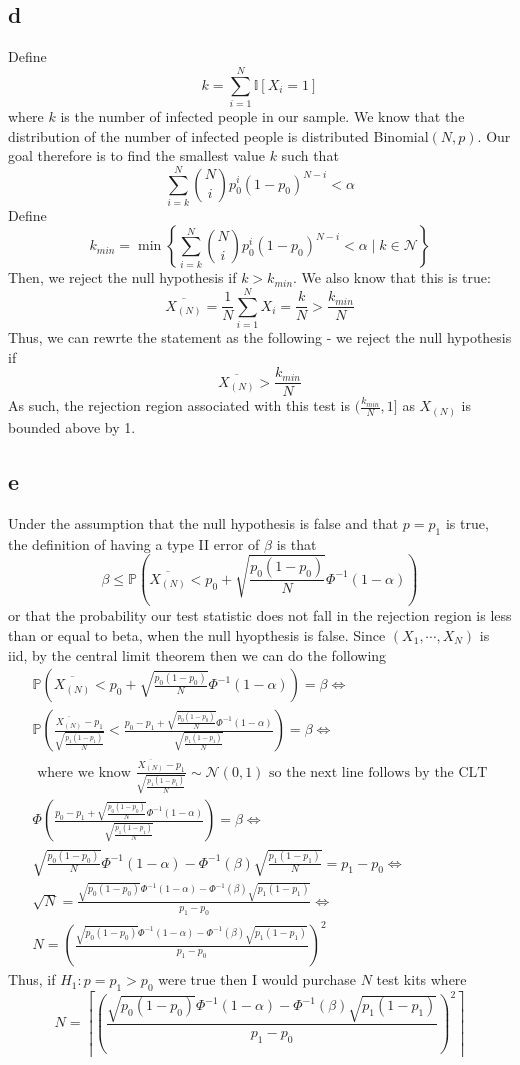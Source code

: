\documentclass[12pt,notitlepage]{article}
\newcommand{\N}{\mathcal{N}}
\begin{document}
\subsection*{d}
Define $$k  = \sum_{i=1}^N \mathbb{I}[X_i = 1]$$ where $k$ is the number of infected people in our sample. We know that the distribution of the number of infected people is distributed Binomial$(N,p)$. Our goal therefore is to find the smallest value $k$ such that $$\sum_{i=k}^N \binom{N}{i} p_0^i (1-p_0)^{N-i} < \alpha$$
Define $$k_{min} = \min \left \{\sum_{i=k}^N \binom{N}{i} p_0^i (1-p_0)^{N-i} < \alpha \mid k \in \N \right \}$$
Then, we reject the null hypothesis if $k > k_{min}$. We also know that this is true: $$\overline{X_{(N)}} = \frac1N \sum_{i=1}^N X_i = \frac{k}{N} > \frac{k_{min}}{N}$$ Thus, we can rewrte the statement as the following - we reject the null hypothesis if $$\overline{X_{(N)}} >  \frac{k_{min}}{N}$$ As such, the rejection region associated with this test is $(\frac{k_{min}}{N}, 1]$ as $X_{(N)}$ is bounded above by 1.
\subsection*{e}
Under the assumption that the null hypothesis is false and that $p=p_1$ is true, the definition of having a type II error of $\beta$ is that
$$\beta \leq \mathbb{P}\left(\overline{X_{(N)}} < p_0 + \sqrt{\frac{p_0(1-p_0)}{N}}\Phi^{-1}(1-\alpha)\right)$$
or that the probability our test statistic does not fall in the rejection region is less than or equal to beta, when the null hyopthesis is false.
Since $(X_1, \cdots, X_N)$ is iid, by the central limit theorem then we can do the following
\begin{align*}
    \mathbb{P}\left(\overline{X_{(N)}} < p_0 + \sqrt{\frac{p_0(1-p_0)}{N}}\Phi^{-1}(1-\alpha)\right) = \beta \iff\\
    \mathbb{P}\left(\frac{\overline{X_{(N)}} - p_1}{\sqrt{\frac{p_1(1-p_1)}{N}}} < \frac{p_0 - p_1 + \sqrt{\frac{p_0(1-p_0)}{N}}\Phi^{-1}(1-\alpha)}{\sqrt{\frac{p_1(1-p_1)}{N}}}\right) = \beta \iff \\
    \text{ where we know $\frac{\overline{X_{(N)}} - p_1}{\sqrt{\frac{p_1(1-p_1)}{N}}} \sim \mathcal{N}(0, 1)$ so the next line follows by the CLT}\\
    \Phi\left(\frac{p_0 - p_1 + \sqrt{\frac{p_0(1-p_0)}{N}}\Phi^{-1}(1-\alpha)}{\sqrt{\frac{p_1(1-p_1)}{N}}}\right) = \beta \iff \\
    \sqrt{\frac{p_0(1-p_0)}{N}}\Phi^{-1}(1-\alpha) - \Phi^{-1}(\beta)\sqrt{\frac{p_1(1-p_1)}{N}} =  p_1 - p_0 \iff \\
    \sqrt{N} = \frac{\sqrt{p_0(1-p_0)}\Phi^{-1}(1 - \alpha) - \Phi^{-1}(\beta) \sqrt{p_1(1-p_1)}}{p_1 - p_0} \iff \\
    N = \left(\frac{\sqrt{p_0(1-p_0)}\Phi^{-1}(1 - \alpha) - \Phi^{-1}(\beta) \sqrt{p_1(1-p_1)}}{p_1 - p_0}\right)^2
\end{align*}
Thus, if $H_1:p = p_1 > p_0$ were true then I would purchase $N$ test kits where $$N =\left \lceil \left(\frac{\sqrt{p_0(1-p_0)}\Phi^{-1}(1 - \alpha) - \Phi^{-1}(\beta) \sqrt{p_1(1-p_1)}}{p_1 - p_0}\right)^2\right\rceil$$
\end{document}
